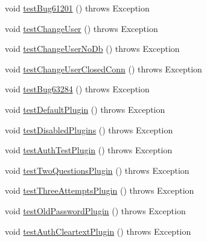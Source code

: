 \begin{DoxyCompactItemize}
\item 
void \mbox{\hyperlink{classtestsuite_1_1regression_1_1_connection_regression_test_a5419daec1c4016ace6f7a03b1ef9e5b3}{test\+Bug61201}} ()  throws Exception 
\item 
void \mbox{\hyperlink{classtestsuite_1_1regression_1_1_connection_regression_test_ad6b91c4ebbce888feac8a193ffb16a9d}{test\+Change\+User}} ()  throws Exception 
\item 
void \mbox{\hyperlink{classtestsuite_1_1regression_1_1_connection_regression_test_a43a4e0bfd3935dc6250525aa394dd023}{test\+Change\+User\+No\+Db}} ()  throws Exception 
\item 
void \mbox{\hyperlink{classtestsuite_1_1regression_1_1_connection_regression_test_a7f870bab2d200c166162052bff227280}{test\+Change\+User\+Closed\+Conn}} ()  throws Exception 
\item 
void \mbox{\hyperlink{classtestsuite_1_1regression_1_1_connection_regression_test_af65ee3514751a771132cf7bf45f59e1b}{test\+Bug63284}} ()  throws Exception 
\item 
void \mbox{\hyperlink{classtestsuite_1_1regression_1_1_connection_regression_test_a2dabc6a8b1c7c5267d3f06b172b8585f}{test\+Default\+Plugin}} ()  throws Exception 
\item 
void \mbox{\hyperlink{classtestsuite_1_1regression_1_1_connection_regression_test_a7bc9c08c55a52f023216c03b73d98502}{test\+Disabled\+Plugins}} ()  throws Exception 
\item 
void \mbox{\hyperlink{classtestsuite_1_1regression_1_1_connection_regression_test_a44633b4bf7b4455aaa3f1d2d7b706275}{test\+Auth\+Test\+Plugin}} ()  throws Exception 
\item 
void \mbox{\hyperlink{classtestsuite_1_1regression_1_1_connection_regression_test_a1d8e845db474ad7bc6ee2ebc92f66799}{test\+Two\+Questions\+Plugin}} ()  throws Exception 
\item 
void \mbox{\hyperlink{classtestsuite_1_1regression_1_1_connection_regression_test_a2be75fd2ea1560d9e1440c0abfeed2c8}{test\+Three\+Attempts\+Plugin}} ()  throws Exception 
\item 
void \mbox{\hyperlink{classtestsuite_1_1regression_1_1_connection_regression_test_a92dac1dbfc42f098280282536c8d6d3b}{test\+Old\+Password\+Plugin}} ()  throws Exception 
\item 
void \mbox{\hyperlink{classtestsuite_1_1regression_1_1_connection_regression_test_a41de8f54f843140cdc27bb116a919ba3}{test\+Auth\+Cleartext\+Plugin}} ()  throws Exception 
\item 

\end{DoxyCompactItemize}
